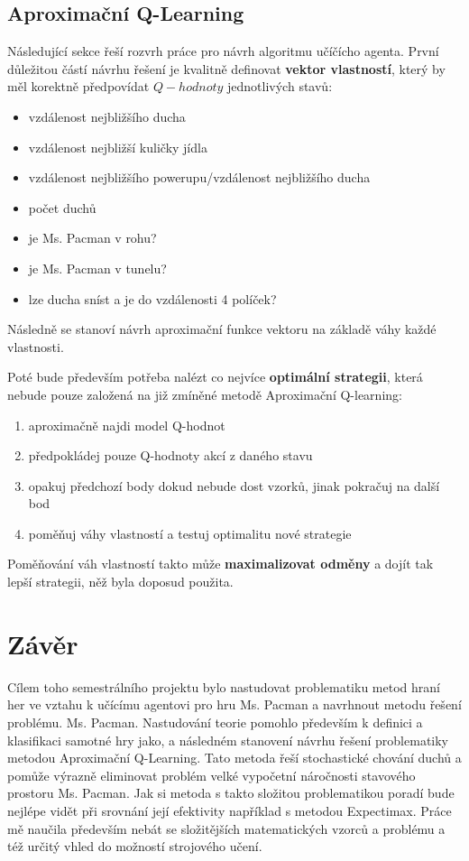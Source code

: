 \section{Aproximační Q-Learning}
Následující sekce řeší rozvrh práce pro návrh algoritmu učíčícho agenta.
První důležitou částí návrhu řešení je kvalitně definovat \textbf{vektor vlastností}, který by měl korektně předpovídat $Q-hodnoty$ jednotlivých stavů:
\begin{itemize}
\item vzdálenost nejbližšího ducha
\item vzdálenost nejbližší kuličky jídla
\item vzdálenost nejbližšího powerupu/vzdálenost nejbližšího ducha
\item počet duchů
\item je Ms. Pacman v rohu?
\item je Ms. Pacman v tunelu?
\item lze ducha sníst a je do vzdálenosti 4 políček?
\end{itemize}
Následně se stanoví návrh aproximační funkce vektoru na základě váhy každé vlastnosti.

Poté bude především potřeba nalézt co nejvíce \textbf{optimální strategii}, která nebude pouze založená na již zmíněné metodě Aproximační Q-learning:
\begin{enumerate}
\item aproximačně najdi model Q-hodnot
\item předpokládej pouze Q-hodnoty akcí z daného stavu
\item opakuj předchozí body dokud nebude dost vzorků, jinak pokračuj na další bod
\item poměňuj váhy vlastností a testuj optimalitu nové strategie
\end{enumerate}
Poměňování váh vlastností takto může \textbf{maximalizovat odměny} a dojít tak lepší strategii, něž byla doposud použita.


\chapter{Závěr}
Cílem toho semestrálního projektu bylo nastudovat problematiku metod hraní her ve vztahu k učícímu agentovi pro hru Ms. Pacman a navrhnout metodu řešení problému. Ms. Pacman. Nastudování teorie pomohlo především k definici a klasifikaci samotné hry jako, a následném stanovení návrhu řešení problematiky metodou Aproximační Q-Learning. Tato metoda řeší stochastické chování duchů a pomůže výrazně eliminovat problém velké vypočetní náročnosti stavového prostoru Ms. Pacman. Jak si metoda s takto složitou problematikou poradí bude nejlépe vidět při srovnání její efektivity například s metodou Expectimax. Práce mě naučila především nebát se složitějších matematických vzorců a problému a též určitý vhled do možností strojového učení.

